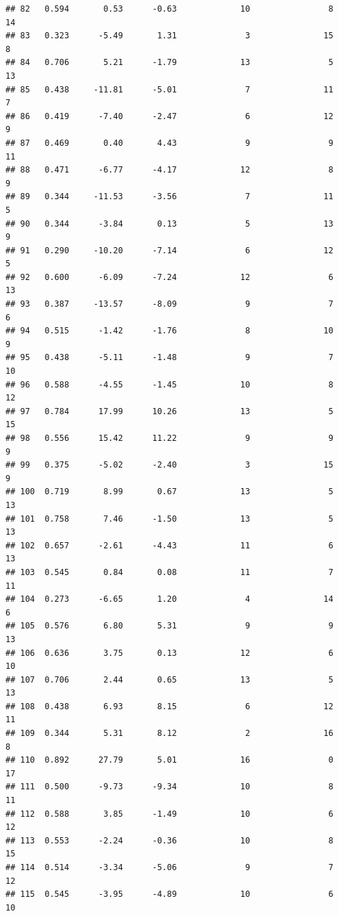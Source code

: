 \documentclass[]{book}
\begin{document}
\begin{verbatim}
## 82   0.594       0.53      -0.63             10                8       14
## 83   0.323      -5.49       1.31              3               15        8
## 84   0.706       5.21      -1.79             13                5       13
## 85   0.438     -11.81      -5.01              7               11        7
## 86   0.419      -7.40      -2.47              6               12        9
## 87   0.469       0.40       4.43              9                9       11
## 88   0.471      -6.77      -4.17             12                8        9
## 89   0.344     -11.53      -3.56              7               11        5
## 90   0.344      -3.84       0.13              5               13        9
## 91   0.290     -10.20      -7.14              6               12        5
## 92   0.600      -6.09      -7.24             12                6       13
## 93   0.387     -13.57      -8.09              9                7        6
## 94   0.515      -1.42      -1.76              8               10        9
## 95   0.438      -5.11      -1.48              9                7       10
## 96   0.588      -4.55      -1.45             10                8       12
## 97   0.784      17.99      10.26             13                5       15
## 98   0.556      15.42      11.22              9                9        9
## 99   0.375      -5.02      -2.40              3               15        9
## 100  0.719       8.99       0.67             13                5       13
## 101  0.758       7.46      -1.50             13                5       13
## 102  0.657      -2.61      -4.43             11                6       13
## 103  0.545       0.84       0.08             11                7       11
## 104  0.273      -6.65       1.20              4               14        6
## 105  0.576       6.80       5.31              9                9       13
## 106  0.636       3.75       0.13             12                6       10
## 107  0.706       2.44       0.65             13                5       13
## 108  0.438       6.93       8.15              6               12       11
## 109  0.344       5.31       8.12              2               16        8
## 110  0.892      27.79       5.01             16                0       17
## 111  0.500      -9.73      -9.34             10                8       11
## 112  0.588       3.85      -1.49             10                6       12
## 113  0.553      -2.24      -0.36             10                8       15
## 114  0.514      -3.34      -5.06              9                7       12
## 115  0.545      -3.95      -4.89             10                6       10

\end{verbatim}
\end{document}
